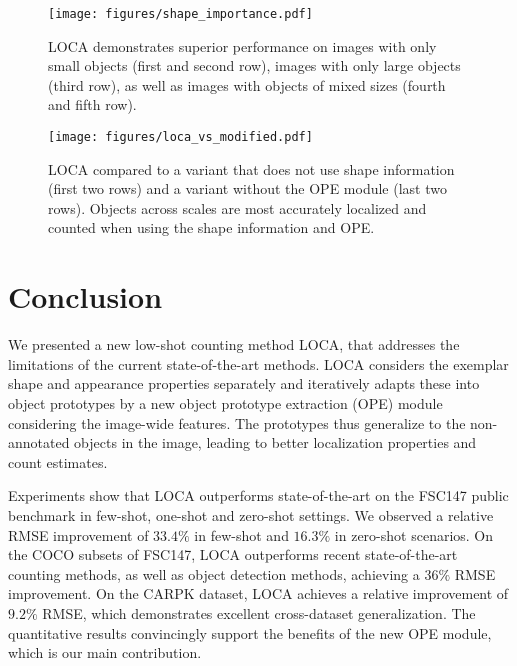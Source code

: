 \documentclass[10pt,twocolumn,letterpaper]{article}
\begin{document}
\begin{figure}
    \centering
\texttt{[image: figures/shape\_importance.pdf]}
\caption{LOCA demonstrates superior performance on images with only small objects (first and second row), images with only large objects (third row), as well as images with objects of mixed sizes (fourth and fifth row).}
    \label{fig:loca_vs_countr}
\end{figure}

\begin{figure}
    \centering
    \texttt{[image: figures/loca\_vs\_modified.pdf]}
    \caption{
    LOCA compared to a variant that does not use shape information (first two rows) and a variant without the OPE module (last two rows). Objects across scales are most accurately localized and counted when using the shape information and OPE. 
    }
    \label{fig:loca_vs_modified}
\end{figure}


\section{Conclusion}


We presented a new low-shot counting method LOCA, that addresses the limitations of the current state-of-the-art methods. LOCA considers the exemplar shape and appearance properties separately and iteratively adapts these into object prototypes by a new object prototype extraction (OPE) module considering the image-wide features. The prototypes thus generalize to the non-annotated objects in the image, leading to better localization properties and count estimates. 



Experiments show that LOCA outperforms state-of-the-art on the FSC147 public benchmark in few-shot, one-shot and zero-shot settings. 
We observed 
a relative RMSE improvement of $33.4\%$ in few-shot and $16.3\%$ in zero-shot scenarios.
On the COCO subsets of FSC147, LOCA outperforms recent state-of-the-art counting methods, as well as object detection methods, achieving a $36\%$ RMSE improvement. 
On the CARPK dataset, LOCA achieves a relative improvement of $9.2\%$ RMSE, which demonstrates excellent cross-dataset generalization. 
The quantitative results convincingly support the benefits of the new OPE module, which is our main contribution.
\end{document}
